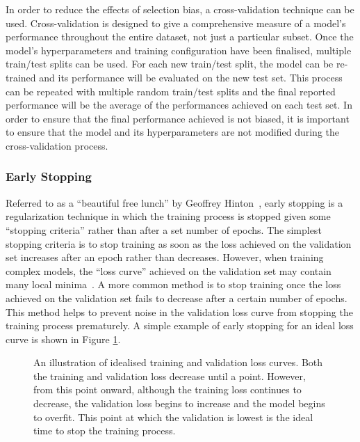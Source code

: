 In order to reduce the effects of selection bias, a cross-validation technique can be used. Cross-validation is designed to give a comprehensive measure of a model's performance throughout the entire dataset, not just a particular subset.  Once the model's hyperparameters and training configuration have been finalised, multiple train/test splits can be used. For each new train/test split, the model can be re-trained and its performance will be evaluated on the new test set. This process can be repeated with multiple random train/test splits and the final reported performance will be the average of the performances achieved on each test set. In order to ensure that the final performance achieved is not biased, it is important to ensure that the model and its hyperparameters are not modified during the cross-validation process.

\subsubsection{Early Stopping}
Referred to as a ``beautiful free lunch'' by Geoffrey Hinton~\cite[p. 141]{earlystoppinglunch}, early stopping is a regularization technique in which the training process is stopped given some ``stopping criteria'' rather than after a set number of epochs. The simplest stopping criteria is to stop training as soon as the loss achieved on the validation set increases after an epoch rather than decreases. However, when training complex models, the ``loss curve'' achieved on the validation set may contain many local minima~\cite{earlystopping}. A more common method is to stop training once the loss achieved on the validation set fails to decrease after a certain number of epochs. This method helps to prevent noise in the validation loss curve from stopping the training process prematurely. A simple example of early stopping for an ideal loss curve is shown in Figure \ref{fig:earlystop}.

\begin{figure}[t]
    \centering
    
    \caption{An illustration of idealised training and validation loss curves. Both the training and validation loss decrease until a point. However, from this point onward, although the training loss continues to decrease, the validation loss begins to increase and the model begins to overfit. This point at which the validation is lowest is the ideal time to stop the training process.}
    \label{fig:earlystop}
\end{figure}

